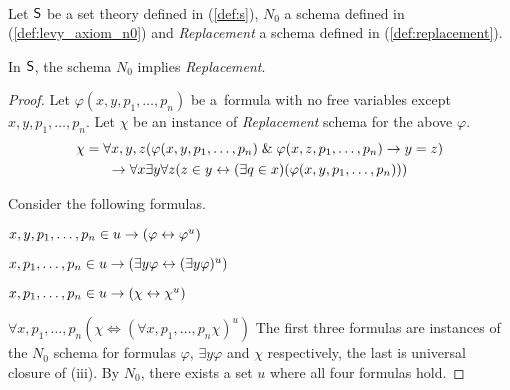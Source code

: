\

Let $\sf{S}$ be a set theory defined in (\ref{def:s}), $N_0$ a schema defined in (\ref{def:levy_axiom_n0}) and \emph{Replacement} a schema defined in (\ref{def:replacement}).
\begin{theorem} 
In $\sf{S}$, the schema $N_0$ implies \emph{Replacement}.
\end{theorem}
\begin{proof}
Let $\varphi(x, y, p_1, \ldots, p_n)$ be a~formula with no free variables except $x, y, p_1, \ldots, p_n$.
Let $\chi$ be an instance of \emph{Replacement} schema for the above $\varphi$.
\begin{equation}
\begin{gathered}
\chi = \forall x, y, z(\varphi(x, y, p_1, \ldots, p_n) \mathrel{\&} \varphi(x, z, p_1, \ldots, p_n) \rightarrow y = z) \\
\rightarrow \forall x \exists y \forall z (z \in y \leftrightarrow (\exists q \in x)(\varphi(x, y, p_1, \ldots, p_n)))
\end{gathered}
\end{equation}

Consider the following formulas. %
\bce[(i)]
\item $x, y, p_1, \ldots, p_n \in u \rightarrow (\varphi \leftrightarrow \varphi^{u}) $
\item $x, p_1, \ldots, p_n \in u \rightarrow (\exists y \varphi \leftrightarrow (\exists y \varphi)^{u})$
\item $x, p_1, \ldots, p_n \in u \rightarrow (\chi \leftrightarrow \chi^{u})$
\item $\forall x, p_1, \ldots, p_n (\chi \iff (\forall x, p_1, \ldots, p_n \chi)^{u})$ %
\ece
The first three formulas are instances of the $N_0$ schema for formulas $\varphi$, $\exists y \varphi$ and $\chi$ respectively, the last is universal closure of (iii).
By $N_0$, there exists a set $u$ where all four formulas hold.


\end{proof}
